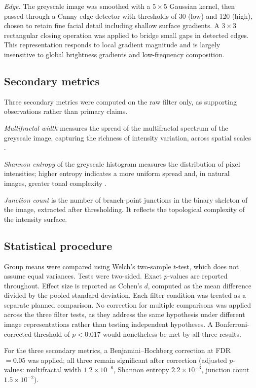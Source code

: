 \documentclass[11pt,a4paper]{article}
\begin{document}
\textit{Edge.} The greyscale image was smoothed with a $5 \times 5$ Gaussian
kernel, then passed through a Canny edge detector with thresholds of 30 (low)
and 120 (high), chosen to retain fine facial detail including shallow surface
gradients. A $3 \times 3$ rectangular closing operation was applied to bridge
small gaps in detected edges. This representation responds to local gradient
magnitude and is largely insensitive to global brightness gradients and
low-frequency composition.

\subsection{Secondary metrics}

Three secondary metrics were computed on the raw filter only, as supporting
observations rather than primary claims.

\textit{Multifractal width} measures the spread of the multifractal spectrum of
the greyscale image, capturing the richness of intensity variation, across spatial
scales \citep{chhabra1989}.

\textit{Shannon entropy} of the greyscale histogram measures the distribution of
pixel intensities; higher entropy indicates a more uniform spread and, in natural
images, greater tonal complexity \citep{shannon1948}.

\textit{Junction count} is the number of branch-point junctions in the binary
skeleton of the image, extracted after thresholding. It reflects the topological
complexity of the intensity surface.

\subsection{Statistical procedure}

Group means were compared using Welch's two-sample $t$-test, which does not
assume equal variances. Tests were two-sided. Exact $p$-values are reported
throughout. Effect size is reported as Cohen's $d$, computed as the mean
difference divided by the pooled standard deviation. Each filter condition was
treated as a separate planned comparison. No correction for multiple comparisons
was applied across the three filter tests, as they address the same hypothesis
under different image representations rather than testing independent hypotheses.
A Bonferroni-corrected threshold of $p < 0.017$ would nonetheless be met by all
three results.

For the three secondary metrics, a Benjamini--Hochberg correction at FDR $= 0.05$
was applied; all three remain significant after correction (adjusted $p$-values:
multifractal width $1.2 \times 10^{-6}$, Shannon entropy $2.2 \times 10^{-3}$,
junction count $1.5 \times 10^{-2}$).
\end{document}
